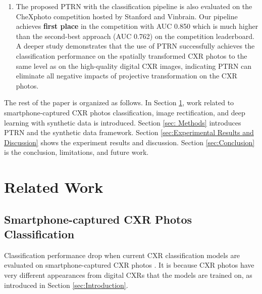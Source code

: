 \documentclass[preprint, 12pt]{elsarticle}
\begin{document}
\begin{enumerate}
    \item The proposed PTRN with the classification pipeline is also evaluated on the CheXphoto competition hosted by Stanford and Vinbrain. Our pipeline achieves \textbf{first place} in the competition with AUC 0.850 which is much higher than the second-best approach (AUC 0.762) on the competition leaderboard. A deeper study demonstrates that the use of PTRN successfully achieves the classification performance on the spatially transformed CXR photos to the same level as on the high-quality digital CXR images, indicating PTRN can eliminate all negative impacts of projective transformation on the CXR photos.
\end{enumerate}

The rest of the paper is organized as follows. In Section \ref{sec:Related Work}, work related to smartphone-captured CXR photos classification, image rectification, and deep learning with synthetic data is introduced. Section \ref{sec: Methods} introduces PTRN and the synthetic data framework. Section \ref{sec:Experimental Results and Discussion} shows the experiment results and discussion. Section \ref{sec:Conclusion} is the conclusion, limitations, and future work.

\section{Related Work} \label{sec:Related Work}
\subsection{Smartphone-captured CXR Photos Classification}
Classification performance drop when current CXR classification models are evaluated on smartphone-captured CXR photos \cite{kuo2021recalibration,chong2021gan,rajpurkar2017chexnet}. It is because CXR photos have very different appearances from digital CXRs that the models are trained on, as introduced in Section \ref{sec:Introduction}.
\end{document}
